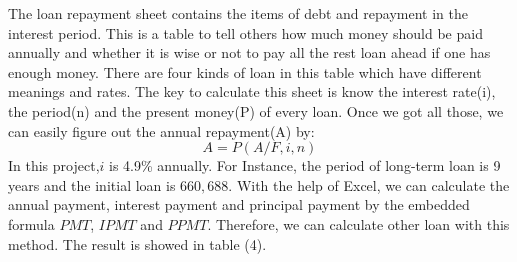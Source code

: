 \documentclass[12pt]{article}
\begin{document}
The loan repayment sheet contains the items of debt and repayment in the interest period. This is a table to tell others how much money should be paid annually and whether it is wise or not to pay all the rest loan ahead if one has enough money.
There are four kinds of loan in this table which have different meanings and rates. The key to calculate this sheet is know the interest rate(i), the period(n) and the present money(P) of every loan. Once we got all those, we can easily figure out the annual repayment(A) by:
\begin{equation}\label{}
  A=P(A/F,i,n)
\end{equation}
In this project,$i$ is 4.9\% annually. For Instance, the period of long-term loan is 9 years and the initial loan is $660,688$. With the help of Excel, we can calculate the annual payment, interest payment and principal payment by the embedded formula $PMT$, $IPMT$ and $PPMT$. Therefore, we can calculate other loan with this method. The result is showed in table (4).
\end{document}
